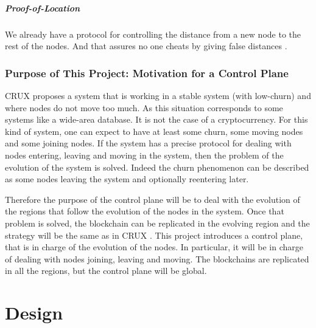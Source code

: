 \documentclass[a4paper,11pt,oneside]{report}
\begin{document}
\paragraph{Proof-of-Location} We already have a protocol for controlling
the distance from a new node to the rest of the nodes. And that assures no one
cheats by giving false distances \cite{Kall2019}. 


\subsection{Purpose of This Project: Motivation for a Control Plane}

CRUX \cite{Basescu2014} proposes a system that is working in a stable system
(with low-churn) and where nodes do not move too much. As this situation
corresponds to some systems like a wide-area database. It is not
the case of a cryptocurrency. For this kind of system, one can expect to have
at least some churn, some moving nodes and some joining nodes. If the
system has a precise protocol for dealing with nodes entering, leaving and
moving in the system, then the problem of the evolution of the system is
solved. Indeed the churn phenomenon can be described as some nodes leaving the
system and optionally reentering later. 

Therefore the purpose of the control plane will be to deal with the evolution
of the regions that follow the evolution of the nodes in the system. Once that
problem is solved, the blockchain can be replicated in the evolving region and
the strategy will be the same as in CRUX \cite{Basescu2014}. This project
introduces a control plane, that is in charge of the evolution of the nodes. In particular, it will be in charge of dealing with nodes
joining, leaving and moving. The blockchains are
replicated in all the regions, but the control plane will be global. 

\chapter{Design} \label{chap:Design} %
\end{document}
